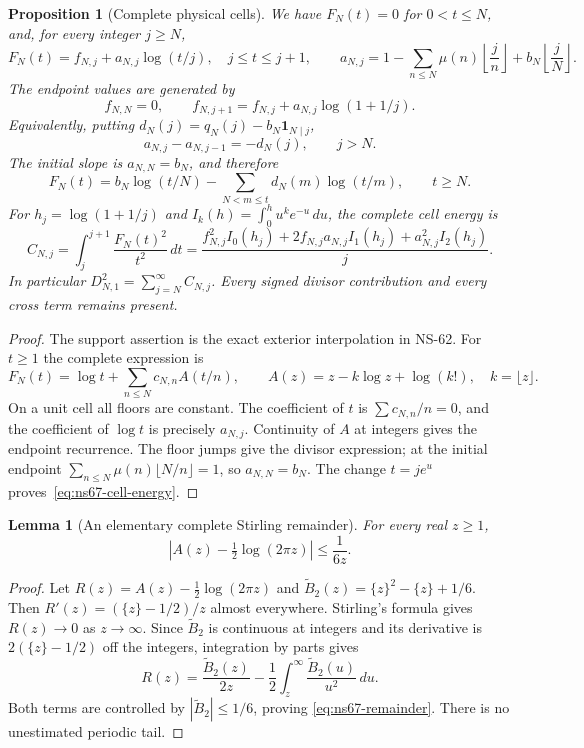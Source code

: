 \documentclass[11pt]{article}
\newtheorem{lemma}[theorem]{Lemma}
\newtheorem{proposition}[theorem]{Proposition}
\theoremstyle{remark}
\begin{document}
\begin{proposition}[Complete physical cells]
\label{prop:ns67-cells}
We have $F_N(t)=0$ for $0<t\leq N$, and, for every integer $j\geq N$,
\begin{equation}
 F_N(t)=f_{N,j}+a_{N,j}\log(t/j),\quad j\leq t\leq j+1,
 \qquad
 a_{N,j}=1-\sum_{n\leq N}\mu(n)\left\lfloor\frac jn\right\rfloor
                   +b_N\left\lfloor\frac jN\right\rfloor.
 \label{eq:ns67-cell}
\end{equation}
The endpoint values are generated by
\[
 f_{N,N}=0,\qquad
 f_{N,j+1}=f_{N,j}+a_{N,j}\log(1+1/j).
\]
Equivalently, putting $d_N(j)=q_N(j)-b_N\mathbf1_{N\mid j}$,
\[
 a_{N,j}-a_{N,j-1}=-d_N(j),\qquad j>N.
\]
The initial slope is $a_{N,N}=b_N$, and therefore
\begin{equation}
 F_N(t)=b_N\log(t/N)
          -\sum_{N<m\leq t}d_N(m)\log(t/m),\qquad t\geq N.
 \label{eq:ns67-divisor-response}
\end{equation}
For $h_j=\log(1+1/j)$ and
$I_k(h)=\int_0^h u^ke^{-u}\,du$, the complete cell energy is
\begin{equation}
 C_{N,j}=\int_j^{j+1}\frac{F_N(t)^2}{t^2}\,dt
 =\frac{f_{N,j}^2 I_0(h_j)+2f_{N,j}a_{N,j}I_1(h_j)
                       +a_{N,j}^2 I_2(h_j)}j.
 \label{eq:ns67-cell-energy}
\end{equation}
In particular $D_{N,1}^2=\sum_{j=N}^\infty C_{N,j}$.
Every signed divisor contribution and every cross term remains present.
\end{proposition}
\begin{proof}
The support assertion is the exact exterior interpolation in NS-62.
For $t\geq1$ the complete expression is
\[
 F_N(t)=\log t+\sum_{n\leq N}c_{N,n}A(t/n),
 \qquad A(z)=z-k\log z+\log(k!),\quad k=\lfloor z\rfloor.
\]
On a unit cell all floors are constant. The coefficient of $t$ is
$\sum c_{N,n}/n=0$, and the coefficient of $\log t$ is precisely
$a_{N,j}$. Continuity of $A$ at integers gives the endpoint recurrence.
The floor jumps give the divisor expression; at the initial endpoint
$\sum_{n\leq N}\mu(n)\lfloor N/n\rfloor=1$, so $a_{N,N}=b_N$.
The change $t=je^u$ proves~\eqref{eq:ns67-cell-energy}.
\end{proof}

\begin{lemma}[An elementary complete Stirling remainder]
\label{lem:ns67-remainder}
For every real $z\geq1$,
\begin{equation}
 \left|A(z)-\tfrac12\log(2\pi z)\right|\leq\frac1{6z}.
 \label{eq:ns67-remainder}
\end{equation}
\end{lemma}
\begin{proof}
Let $R(z)=A(z)-\tfrac12\log(2\pi z)$ and
$\widetilde B_2(z)=\{z\}^2-\{z\}+1/6$.
Then $R'(z)=(\{z\}-1/2)/z$ almost everywhere.
Stirling's formula gives $R(z)\to0$ as $z\to\infty$.
Since $\widetilde B_2$ is continuous at integers and its derivative
is $2(\{z\}-1/2)$ off the integers, integration by parts gives
\[
 R(z)=\frac{\widetilde B_2(z)}{2z}
             -\frac12\int_z^\infty\frac{\widetilde B_2(u)}{u^2}\,du.
\]
Both terms are controlled by $|\widetilde B_2|\leq1/6$, proving
\eqref{eq:ns67-remainder}. There is no unestimated periodic tail.
\end{proof}
\end{document}
